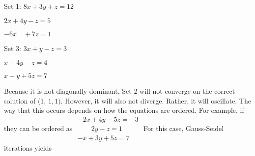 \documentclass[../main.tex]{subfiles}
\begin{document}
\begin{enumerate}[label=\bfseries(\alph*)]
Set 1: \quad\hspace*{0.1cm}$8 x+3 y+z=12$

\quad\hspace*{1cm}$2 x+4 y-z=5$

\quad\hspace*{0.85cm}$-6 x\quad    +7 z=1$

\bigbreak
Set 3: \quad$3 x+y-z=3$

\quad\hspace*{0.9cm}$x+4 y-z=4$

\quad\hspace*{0.9cm}$x+y+5 z=7$
\bigbreak

Because it is not diagonally dominant, Set 2 will not converge on the correct solution of (1, $1,1)$. However, it will also not diverge. Rather, it will oscillate. The way that this occurs depends on how the equations are ordered. For example, if they can be ordered as
\bigbreak$
\begin{gathered}
-2 x+4 y-5 z=-3 \\
\quad\quad2 y-z   	=1 \\
-x+3 y+5 z=7
\end{gathered}$
\bigbreak
For this case, Gauss-Seidel iterations yields
\bigbreak


\end{enumerate}
\end{document}
